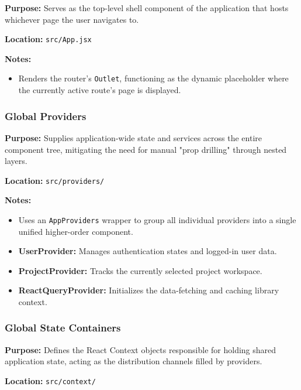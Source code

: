 \textbf{Purpose:} Serves as the top-level shell component of the application that hosts whichever page the user navigates to.

\vspace{0.2cm}
\noindent\textbf{Location:} \texttt{src/App.jsx}

\vspace{0.2cm}
\noindent\textbf{Notes:}
\begin{itemize}
    \item Renders the router's \texttt{Outlet}, functioning as the dynamic placeholder where the currently active route's page is displayed.
\end{itemize}

\subsubsection{Global Providers}

\textbf{Purpose:} Supplies application-wide state and services across the entire component tree, mitigating the need for manual "prop drilling" through nested layers.

\vspace{0.2cm}
\noindent\textbf{Location:} \texttt{src/providers/}

\vspace{0.2cm}
\noindent\textbf{Notes:}
\begin{itemize}
    \item Uses an \texttt{AppProviders} wrapper to group all individual providers into a single unified higher-order component.
    \item \textbf{UserProvider:} Manages authentication states and logged-in user data.
    \item \textbf{ProjectProvider:} Tracks the currently selected project workspace.
    \item \textbf{ReactQueryProvider:} Initializes the data-fetching and caching library context.
\end{itemize}

\subsubsection{Global State Containers}

\textbf{Purpose:} Defines the React Context objects responsible for holding shared application state, acting as the distribution channels filled by providers.

\vspace{0.2cm}
\noindent\textbf{Location:} \texttt{src/context/}

